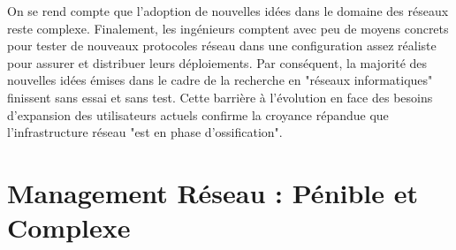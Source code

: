 On se rend compte que l'adoption de nouvelles idées dans le domaine des réseaux reste complexe.  Finalement, les ingénieurs comptent avec peu de moyens concrets pour tester de nouveaux protocoles réseau dans une configuration assez réaliste pour assurer et distribuer leurs déploiements. Par conséquent, la majorité des nouvelles idées émises dans le cadre de la recherche en "réseaux informatiques" finissent sans essai et sans test. Cette barrière à l'évolution en face des besoins d'expansion des utilisateurs actuels confirme la croyance répandue que l'infrastructure réseau "est en phase d'ossification". \cite{OpenFlowStanfordOssification} 


\section{Management Réseau : Pénible et Complexe}






